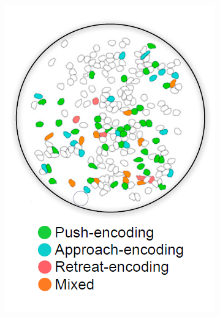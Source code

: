\documentclass[12pt, a4paper]{article}
\begin{document}
\begin{figure}[H]
	\begin{minipage}{\linewidth}
		\centering
		\begin{minipage}{0.4\linewidth}
			\begin{figure}[H]
				\includegraphics[width=\linewidth]{kingsbury2.png}
				

\end{figure}
\end{minipage}
\end{minipage}
\end{figure}
\end{document}
